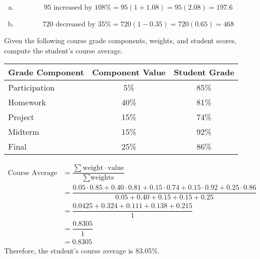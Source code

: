 \documentclass[12pt,letterpaper]{exam}
\begin{document}
\begin{questions}
\sol 
\begin{enumerate}[(a)]
\item 
	\[
	\text{95 increased by 108\%}= 95 (1 + 1.08)= 95(2.08)=  197.6
	\] \pspace

\item 
	\[
	\text{720 decreased by 35\%}= 720(1 - 0.35)= 720(0.65)= 468
	\]
\end{enumerate}



\newpage
\question[5] Given the following course grade components, weights, and student scores, compute the student's course average. 
	\begin{table}[H]
	\centering
	\begin{tabular}{lcc}
	Grade Component & Component Value & Student Grade \\ \hline
	Participation & 5\% & 85\% \\
	Homework & 40\% & 81\% \\
	Project & 15\% & 74\% \\
	Midterm & 15\% & 92\% \\
	Final & 25\% & 86\%
	\end{tabular}
	\end{table} \pspace

\sol 
	\[
	\begin{aligned}
	\text{Course Average}&= \dfrac{\sum \text{weight} \cdot \text{value}}{\sum \text{weights}} \\[0.3cm]
	&= \dfrac{0.05 \cdot 0.85 + 0.40 \cdot 0.81 + 0.15 \cdot 0.74 + 0.15 \cdot 0.92 + 0.25 \cdot 0.86}{0.05 + 0.40 + 0.15 + 0.15 + 0.25} \\[0.3cm]
	&= \dfrac{0.0425 + 0.324 + 0.111 + 0.138 + 0.215}{1} \\[0.3cm]
	&= \dfrac{0.8305}{1} \\[0.3cm]
	&= 0.8305
	\end{aligned}
	\] \pspace
Therefore, the student's course average is 83.05\%.




\end{questions}
\end{document}
